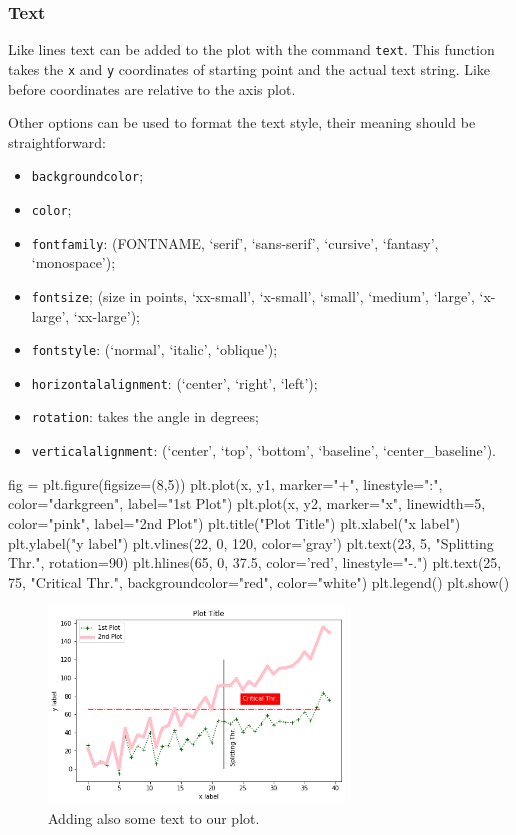 \subsubsection{Text}\label{text}

Like lines text can be added to the plot with the command \texttt{text}.
This function takes the \texttt{x} and \texttt{y} coordinates of starting point and the actual text string. Like before coordinates are relative to the axis plot.

Other options can be used to format the text style, their meaning should be straightforward:

\begin{itemize}
	\tightlist
	\item
	\texttt{backgroundcolor};
	\item
	\texttt{color};
	\item
	\texttt{fontfamily}: (FONTNAME, `serif', `sans-serif', `cursive', `fantasy', `monospace');
	\item
	\texttt{fontsize}; (size in points, `xx-small', `x-small', `small', `medium', `large', `x-large', `xx-large');
	\item
	\texttt{fontstyle}: (`normal', `italic', `oblique');
	\item
	\texttt{horizontalalignment}: (`center', `right', `left');
	\item
	\texttt{rotation}: takes the angle in degrees;
	\item
	\texttt{verticalalignment}: (`center', `top', `bottom', `baseline', `center\_baseline').
\end{itemize}

\begin{ipython}
fig = plt.figure(figsize=(8,5))
plt.plot(x, y1, marker="+", linestyle=":", color="darkgreen", label="1st Plot")
plt.plot(x, y2, marker="x", linewidth=5, color="pink", label="2nd Plot")
plt.title("Plot Title")
plt.xlabel("x label")
plt.ylabel("y label")
plt.vlines(22, 0, 120, color='gray')
plt.text(23, 5, "Splitting Thr.", rotation=90)
plt.hlines(65, 0, 37.5, color='red', linestyle="-.")
plt.text(25, 75, "Critical Thr.", backgroundcolor="red", color="white")
plt.legend()
plt.show()
\end{ipython}

\begin{figure}[htb]
	\centering
	\includegraphics[width=0.7\textwidth]{figures/text}
	\caption{Adding also some text to our plot.}
	\label{fig:text}
\end{figure}

